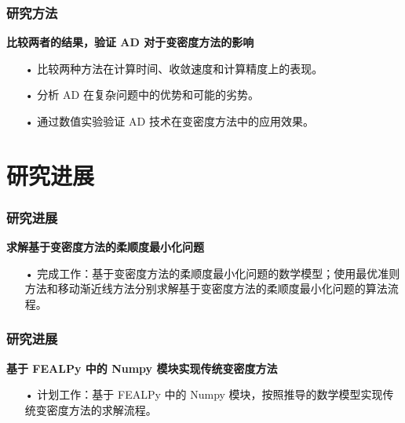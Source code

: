 \documentclass{beamer}
\numberwithin{subsection}{section}
\begin{document}
\begin{frame}
	\frametitle{研究方法}
	 \textbf{比较两者的结果，验证 AD 对于变密度方法的影响}
	 \vspace{0.3cm}
    \begin{itemize}
        \item[•]比较两种方法在计算时间、收敛速度和计算精度上的表现。
        \vspace{0.3cm}
        \item[•]分析 AD 在复杂问题中的优势和可能的劣势。
        \vspace{0.3cm}
        \item[•]通过数值实验验证 AD 技术在变密度方法中的应用效果。
    \end{itemize}
\end{frame}

\section{研究进展}

\begin{frame}
    \frametitle{研究进展}
    \textbf{求解基于变密度方法的柔顺度最小化问题}
    \vspace{0.3cm}
    \begin{itemize}
        \item[•]完成工作：基于变密度方法的柔顺度最小化问题的数学模型；使用最优准则方法和移动渐近线方法分别求解基于变密度方法的柔顺度最小化问题的算法流程。
    \end{itemize}
\end{frame}

\begin{frame}
    \frametitle{研究进展}
    \textbf{基于 FEALPy 中的 Numpy 模块实现传统变密度方法}
    \vspace{0.3cm}
    \begin{itemize}
        \item[•]计划工作：基于 FEALPy 中的 Numpy 模块，按照推导的数学模型实现传统变密度方法的求解流程。
    \end{itemize}
\end{frame}
\end{document}
